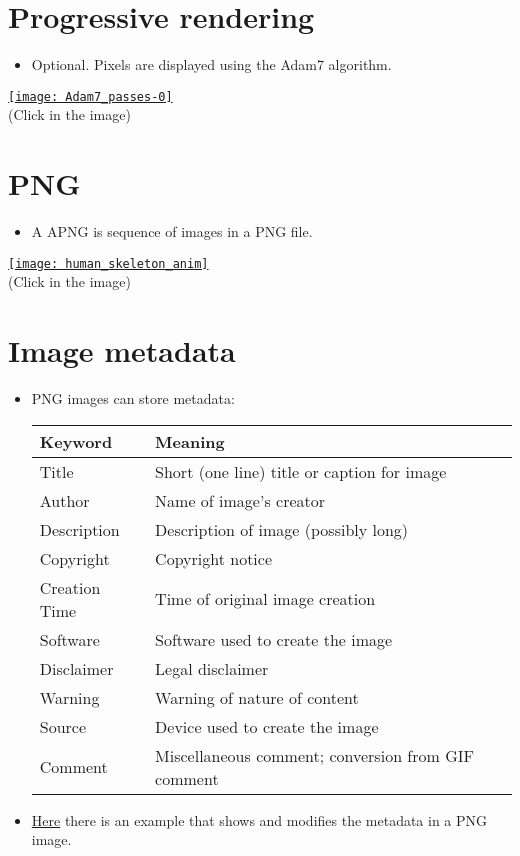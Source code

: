 \section{Progressive rendering}
\begin{itemize}
\item Optional. Pixels are displayed using the Adam7 algorithm.
\end{itemize}
\begin{center}
  \href{https://upload.wikimedia.org/wikipedia/commons/2/27/Adam7_passes.gif}{\texttt{[image: Adam7\_passes-0]}} \\
  (Click in the image)
\end{center}
  
\section{ PNG}
\begin{itemize}
\item A \gls{APNG} is sequence of images in a \gls{PNG} file.
\end{itemize}
\begin{center}
  \href{https://commons.wikimedia.org/wiki/Category:Animated_PNG_files#/media/File:201805_human_skeleton_anim.png}{\texttt{[image: human\_skeleton\_anim]}} \\
  (Click in the image)
\end{center}

\section{Image metadata}
\begin{itemize}
\item \gls{PNG} images can store metadata:
  \begin{center}
    \begin{tabular}{l|l}
      Keyword & Meaning\\
      \hline
      Title & Short (one line) title or caption for image \\
      Author & Name of image's creator \\
      Description & Description of image (possibly long) \\
      Copyright & Copyright notice \\
      Creation Time & Time of original image creation \\
      Software & Software used to create the image \\
      Disclaimer & Legal disclaimer \\
      Warning & Warning of nature of content \\
      Source & Device used to create the image \\
      Comment & Miscellaneous comment; conversion from GIF comment
    \end{tabular}
  \end{center}
\end{itemize}

\begin{itemize}
\item
  \href{https://github.com/vicente-gonzalez-ruiz/medical_imaging/blob/main/notebooks/PNG_add_metadata.ipynb}{Here}
  there is an example that shows and modifies the metadata in a PNG
  image.
\end{itemize}